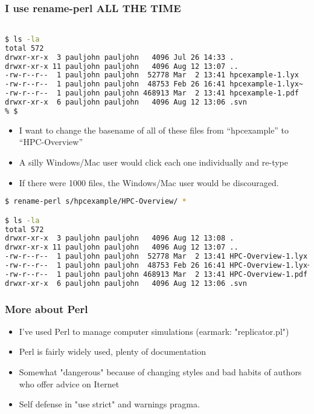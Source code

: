 \documentclass[English]{beamer}
\begin{document}
\begin{frame}
  \frametitle{I use rename-perl ALL THE TIME}

\begin{lstlisting}[basicstyle={\tiny},breaklines=true,language=bash]

$ ls -la
total 572
drwxr-xr-x  3 pauljohn pauljohn   4096 Jul 26 14:33 .
drwxr-xr-x 11 pauljohn pauljohn   4096 Aug 12 13:07 ..
-rw-r--r--  1 pauljohn pauljohn  52778 Mar  2 13:41 hpcexample-1.lyx
-rw-r--r--  1 pauljohn pauljohn  48753 Feb 26 16:41 hpcexample-1.lyx~
-rw-r--r--  1 pauljohn pauljohn 468913 Mar  2 13:41 hpcexample-1.pdf
drwxr-xr-x  6 pauljohn pauljohn   4096 Aug 12 13:06 .svn
% $
\end{lstlisting}

\begin{itemize}
\item I want to change the basename of all of these files from
``hpcexample'' to ``HPC-Overview'' 
\item A silly Windows/Mac user would click each one individually and
  re-type
\item If there were 1000 files, the Windows/Mac user would be discouraged.
\end{itemize}


\begin{lstlisting}[basicstyle={\tiny},breaklines=true,language=bash]
$ rename-perl s/hpcexample/HPC-Overview/ *

$ ls -la
total 572
drwxr-xr-x  3 pauljohn pauljohn   4096 Aug 12 13:08 .
drwxr-xr-x 11 pauljohn pauljohn   4096 Aug 12 13:07 ..
-rw-r--r--  1 pauljohn pauljohn  52778 Mar  2 13:41 HPC-Overview-1.lyx
-rw-r--r--  1 pauljohn pauljohn  48753 Feb 26 16:41 HPC-Overview-1.lyx~
-rw-r--r--  1 pauljohn pauljohn 468913 Mar  2 13:41 HPC-Overview-1.pdf
drwxr-xr-x  6 pauljohn pauljohn   4096 Aug 12 13:06 .svn

\end{lstlisting}

\end{frame}

\begin{frame}
  \frametitle{More about Perl}
  \begin{itemize}
  \item I've used Perl to manage computer simulations (earmark:
    "replicator.pl")
  \item Perl is fairly widely used, plenty of documentation
  \item Somewhat "dangerous" because of changing styles and bad habits
    of authors who offer advice on Iternet
  \item Self defense in "use strict" and warnings pragma.
  \end{itemize}
\end{frame}
\end{document}
